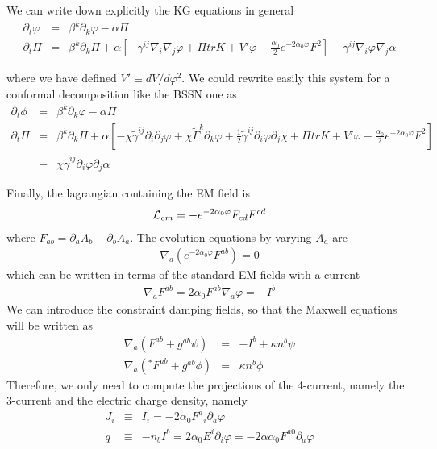 \documentclass[letter,prd,aps,floatfix,superscriptaddress]{revtex4}
\begin{document}
We can write down explicitly the KG equations in general
\begin{eqnarray}
  \partial_t \varphi &=& \beta^k \partial_k \varphi - \alpha \Pi
\\
  \partial_t \Pi &=& \beta^k \partial_k \Pi 
   +  \alpha \left[ -\gamma^{ij} \nabla_i \nabla_j \varphi + \Pi trK + V' \varphi - \frac{\alpha_0}{2} e^{-2 \alpha_0 \varphi} F^2\right]
   - \gamma^{ij} \nabla_i \varphi \nabla_j \alpha
\end{eqnarray}

where we have defined $V' \equiv dV/d \varphi^2$. We could rewrite easily this system for a conformal decomposition like the BSSN one as
\begin{eqnarray}
  \partial_t \phi &=& \beta^k \partial_k \varphi - \alpha \Pi
\\
  \partial_t \Pi &=& \beta^k \partial_k \Pi 
   +  \alpha \left[ -\chi \tilde{\gamma}^{ij} \partial_i \partial_j \varphi + \chi \tilde{\Gamma}^k \partial_k \varphi + \frac{1}{2} \tilde{\gamma}^{ij} \partial_i \varphi \partial_j \chi  + \Pi trK + V' \varphi
   - \frac{\alpha_0}{2} e^{-2 \alpha_0 \varphi} F^2 \right] 
\nonumber \\
&-& \chi \tilde{\gamma}^{ij} \partial_i \varphi \partial_j \alpha
\end{eqnarray}




Finally, the lagrangian containing the EM field is 
\begin{eqnarray}
  {\cal L}_{em} = - e^{-2 \alpha_0 \varphi} F_{cd} F^{cd}
\end{eqnarray}
where $F_{ab} = \partial_a A_b - \partial_b A_a$. The evolution equations
by varying $A_a$ are
\begin{eqnarray}
  \nabla_a \left(  e^{-2 \alpha_0 \varphi} F^{ab} \right) = 0
\end{eqnarray}
which can be written in terms of the standard EM fields with a current
\begin{eqnarray}
  \nabla_a  F^{ab}  = 2 \alpha_0 F^{ab} \nabla_a \varphi = -I^b
\end{eqnarray}
We can introduce the constraint damping fields, so that the Maxwell equations will be written as
\begin{eqnarray}
  \nabla_a  (F^{ab} + g^{ab} \psi)  &=& -I^b + \kappa n^b \psi\\
    \nabla_a  ({}^*F^{ab} + g^{ab} \phi)  &=& \kappa n^b \phi
\end{eqnarray}
Therefore, we only need to compute the projections of the 4-current, namely the 3-current and the electric charge density,
namely
\begin{eqnarray}
 J_i &\equiv& I_i = -2 \alpha_0 {F^a}_i \partial_a \varphi 
\\ 
q &\equiv& -n_b I^b = 2 \alpha_0 E^i \partial_i \varphi = -2 \alpha \alpha_0  F^{a0} \partial_a \varphi
\end{eqnarray}



\end{document}
